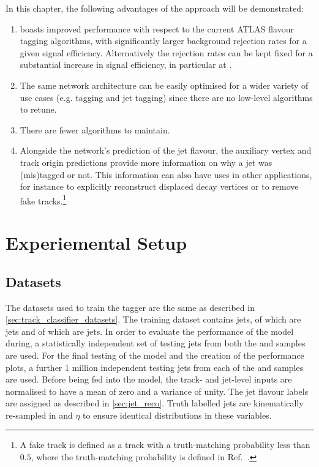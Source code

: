 In this chapter, the following advantages of the \GNN approach will be demonstrated:

\newcommand{\fakesfootnote}{%
A fake track is defined as a track with a truth-matching probability less than $0.5$, where the truth-matching probability is defined in Ref.~\cite{PERF-2015-08}.
}
\begin{enumerate}
    \item \GNN boasts improved performance with respect to the current ATLAS flavour tagging algorithms, with significantly larger background rejection rates for a given signal efficiency. Alternatively the rejection rates can be kept fixed for a substantial increase in signal efficiency, in particular at \highpt.
    \item The same network architecture can be easily optimised for a wider variety of use cases (e.g. \cjet tagging and \highpt jet tagging) since there are no low-level algorithms to retune.
    \item There are fewer algorithms to maintain.
    \item Alongside the network's prediction of the jet flavour, the auxiliary vertex and track origin predictions provide more information on why a jet was (mis)tagged or not. This information can also have uses in other applications, for instance to explicitly reconstruct displaced decay vertices or to remove fake tracks.\footnote{\fakesfootnote}
\end{enumerate}



\section{Experiemental Setup}\label{sec:experimental_setup}

\subsection{Datasets}\label{sec:datasets}

The datasets used to train the \GNN tagger are the same as described in \cref{sec:track_classifier_datasets}.
The training dataset contains \njetstrain jets,  of which are \ttbar jets and  of which are \Zprime jets.
In order to evaluate the performance of the model during, a statistically independent set of \njetsval testing jets from both the \ttbar and \Zprime samples are used.
For the final testing of the model and the creation of the performance plots, a further 1 million independent testing jets from each of the \ttbar and \Zprime samples are used.
Before being fed into the model, the track- and jet-level inputs are normalised to have a mean of zero and a variance of unity. 
The jet flavour labels are assigned as described in \cref{sec:jet_reco}.
Truth labelled \bcl jets are kinematically re-sampled in \pt and $\eta$ to ensure identical distributions in these variables.


